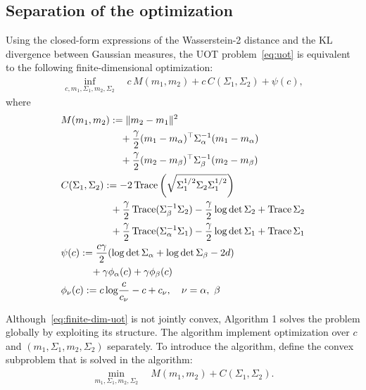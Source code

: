 \documentclass{ifacconf}
\newcommand{\tr}{\mathop{\rm Trace}\nolimits}
\begin{document}
\subsection{Separation of the optimization}\label{subsection:uot-separation}
Using the closed-form expressions of the Wasserstein-2 distance and the KL divergence between Gaussian measures, the UOT problem~\eqref{eq:uot} is equivalent to the following finite-dimensional optimization:
\begin{align}\label{eq:finite-dim-uot}
    \inf_{c,m_1,\Sigma_1,m_2,\Sigma_2} \quad c\,M(m_1,m_2) + c\,C(\Sigma_1,\Sigma_2) + \psi(c),
\end{align}
where
\begin{align}\label{eq:def-of-psi}
    &M(m_1,m_2) := \|m_2-m_1\|^2  \nonumber\\
    &\qquad\qquad\qquad +\frac{\gamma}{2}(m_1-m_\alpha)^\top\Sigma_\alpha^{-1}(m_1-m_\alpha)  \nonumber\\
    &\qquad\qquad\qquad +\frac{\gamma}{2}(m_2-m_\beta )^\top\Sigma_\beta ^{-1}(m_2-m_\beta )   \nonumber\\
    &C(\Sigma_1,\Sigma_2) :=-2\tr\left(\sqrt{\Sigma_1^{1/2}\Sigma_2\Sigma_1^{1/2}}\right) \nonumber\\
    &\qquad\qquad\quad + \frac{\gamma}{2}\tr(\Sigma_\beta^{-1}\Sigma_{2}) -\frac{\gamma}{2}\log\det\Sigma_{2}+\tr\Sigma_{2}  \nonumber\\
    &\qquad\qquad\quad + \frac{\gamma}{2}\tr(\Sigma_\alpha^{-1}\Sigma_1)-\frac{\gamma}{2}\log\det\Sigma_1+\tr\Sigma_{1} \nonumber\\
    &\psi(c):= \frac{c\gamma}{2}(\log\det\Sigma_{\alpha} + \log\det\Sigma_{\beta} -2d)   \nonumber\\
    &\qquad\quad + \gamma\phi_{\alpha}(c) + \gamma\phi_{\beta}(c) \\
    &\phi_\nu(c):=c\log\!\frac{c}{c_\nu}-c+c_\nu, \quad \nu = \alpha,\ \beta\nonumber
\end{align}

Although~\eqref{eq:finite-dim-uot} is not jointly convex, Algorithm 1 solves the problem globally by exploiting its structure. The algorithm implement  optimization over $c$ and $(m_1,\Sigma_1,m_2,\Sigma_2)$ separately. To introduce the algorithm, define the convex subproblem that is solved in the algorithm:
\begin{align}\label{eq:uot-subproblem}
    \min_{m_1,\Sigma_1,m_2,\Sigma_2}\quad M(m_1,m_2) + C(\Sigma_1,\Sigma_2).
\end{align}
\end{document}

